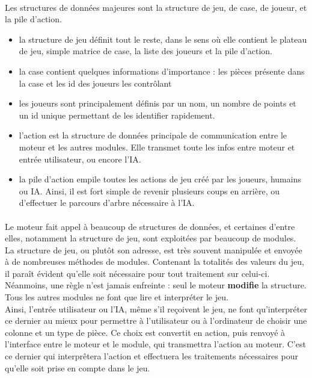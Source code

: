 \documentclass{report}
\begin{document}
        \paragraph*{}
        Les structures de données majeures sont la structure de jeu, de case, de joueur, et la pile d'action.
        \begin{itemize} %
            \item la structure de jeu définit tout le reste, dans le sens où elle contient le plateau de jeu, simple matrice de case, la liste des joueurs et la pile d'action.
            \item la case contient quelques informations d'importance : les pièces présente dans la case et les id des joueurs les contrôlant
            \item les joueurs sont principalement définis par un nom, un nombre de points et un id unique permettant de les identifier rapidement.
            \item l'action est la structure de données principale de communication entre le moteur et les autres modules. Elle transmet toute les infos entre moteur et entrée utilisateur,
                ou encore l'IA.
            \item la pile d'action empile toutes les actions de jeu créé par les joueurs, humains ou IA. Ainsi, il est fort simple de revenir plusieurs coups en arrière, 
                ou d'effectuer le parcours d'arbre nécessaire à l'IA.
        \end{itemize}
        \paragraph*{} %
        Le moteur fait appel à beaucoup de structures de données, et certaines d'entre elles, notamment la structure de jeu, sont exploitées par beaucoup de modules. \\
        La structure de jeu, ou plutôt son adresse, est très souvent manipulée et envoyée à de nombreuses méthodes de modules. Contenant la totalités des valeurs du jeu, il paraît évident
        qu'elle soit nécessaire pour tout traitement sur celui-ci. Néanmoins, une règle n'est jamais enfreinte : seul le moteur \textbf{modifie} la structure. Tous les autres modules ne
        font que lire et interpréter le jeu. \\
        Ainsi, l'entrée utilisateur ou l'IA, même s'il reçoivent le jeu, ne font qu'interpréter ce dernier au mieux pour permettre à 
        l'utilisateur ou à l'ordinateur de choisir une colonne et un type de pièce. Ce choix est convertit en action, puis renvoyé à l'interface entre le moteur et le module, 
        qui transmettra l'action au moteur. C'est ce dernier qui interprêtera l'action et effectuera les traitements nécessaires pour qu'elle soit prise en compte dans le jeu. 
\end{document}
